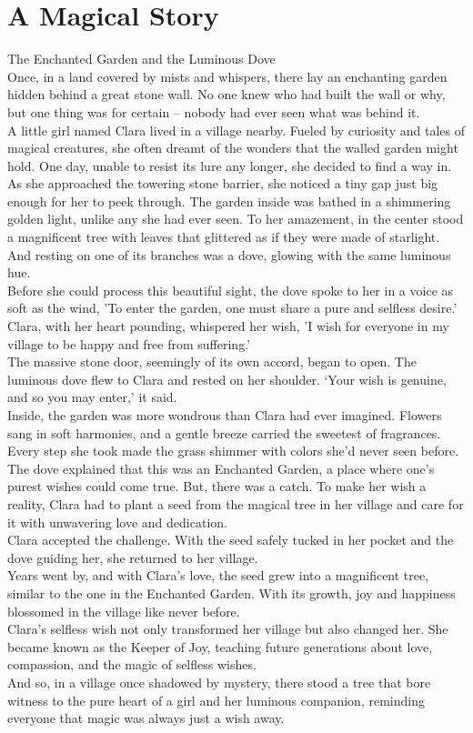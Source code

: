 \documentclass[a4paper,12pt]{article}
\begin{document}
\section{A Magical Story}
The Enchanted Garden and the Luminous Dove\\
Once, in a land covered by mists and whispers, there lay an enchanting garden hidden behind a great stone wall. No one knew who had built the wall or why, but one thing was for certain – nobody had ever seen what was behind it.\\
A little girl named Clara lived in a village nearby. Fueled by curiosity and tales of magical creatures, she often dreamt of the wonders that the walled garden might hold. One day, unable to resist its lure any longer, she decided to find a way in.\\
As she approached the towering stone barrier, she noticed a tiny gap just big enough for her to peek through. The garden inside was bathed in a shimmering golden light, unlike any she had ever seen. To her amazement, in the center stood a magnificent tree with leaves that glittered as if they were made of starlight. And resting on one of its branches was a dove, glowing with the same luminous hue.\\
Before she could process this beautiful sight, the dove spoke to her in a voice as soft as the wind, 'To enter the garden, one must share a pure and selfless desire.'\\
Clara, with her heart pounding, whispered her wish, 'I wish for everyone in my village to be happy and free from suffering.'\\
The massive stone door, seemingly of its own accord, began to open. The luminous dove flew to Clara and rested on her shoulder. ‘Your wish is genuine, and so you may enter,' it said.\\
Inside, the garden was more wondrous than Clara had ever imagined. Flowers sang in soft harmonies, and a gentle breeze carried the sweetest of fragrances. Every step she took made the grass shimmer with colors she'd never seen before.\\
The dove explained that this was an Enchanted Garden, a place where one’s purest wishes could come true. But, there was a catch. To make her wish a reality, Clara had to plant a seed from the magical tree in her village and care for it with unwavering love and dedication.\\
Clara accepted the challenge. With the seed safely tucked in her pocket and the dove guiding her, she returned to her village.\\
Years went by, and with Clara's love, the seed grew into a magnificent tree, similar to the one in the Enchanted Garden. With its growth, joy and happiness blossomed in the village like never before.\\
Clara's selfless wish not only transformed her village but also changed her. She became known as the Keeper of Joy, teaching future generations about love, compassion, and the magic of selfless wishes.\\
And so, in a village once shadowed by mystery, there stood a tree that bore witness to the pure heart of a girl and her luminous companion, reminding everyone that magic was always just a wish away.\\
\end{document}
